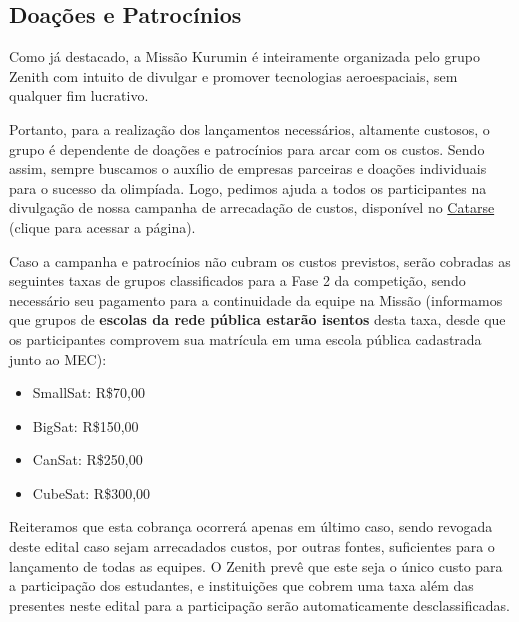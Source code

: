     \subsection{Doações e Patrocínios}
        Como já destacado, a Missão Kurumin é inteiramente organizada pelo grupo Zenith com intuito de divulgar e promover tecnologias aeroespaciais, sem qualquer fim lucrativo.

        Portanto, para a realização dos lançamentos necessários, altamente custosos, o grupo é dependente de doações e patrocínios para arcar com os custos. Sendo assim, sempre buscamos o auxílio de empresas parceiras e doações individuais para o sucesso da olimpíada. Logo, pedimos ajuda a todos os participantes na divulgação de nossa campanha de arrecadação de custos, disponível no \href{https://www.catarse.me/missao_kurumim_2024}{\color{highcolor}Catarse} (clique para acessar a página).
    
        Caso a campanha e patrocínios não cubram os custos previstos, serão cobradas as seguintes taxas de grupos classificados para a Fase 2 da competição, sendo necessário seu pagamento para a continuidade da equipe na Missão (informamos que grupos de \textbf{escolas da rede pública estarão isentos} desta taxa, desde que os participantes comprovem sua matrícula em uma escola pública cadastrada junto ao MEC):
      
        \begin{itemize}
            \item SmallSat: R\$70,00
            \item BigSat: R\$150,00
            \item CanSat: R\$250,00
            \item CubeSat: R\$300,00
        \end{itemize}
        
        Reiteramos que esta cobrança ocorrerá apenas em último caso, sendo revogada deste edital caso sejam arrecadados custos, por outras fontes, suficientes para o lançamento de todas as equipes. O Zenith prevê que este seja o único custo para a participação dos estudantes, e instituições que cobrem uma taxa além das presentes neste edital para a participação serão automaticamente desclassificadas.
